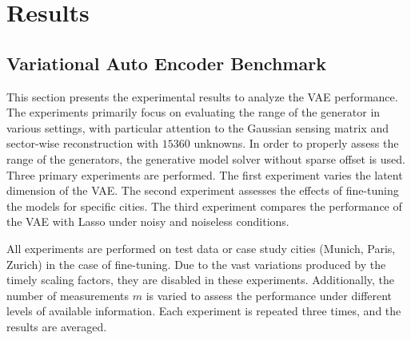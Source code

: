 
\chapter{Results}\label{chapter:results}
\section{Variational Auto Encoder Benchmark}\label{section:vae_benchmark}
This section presents the experimental results to analyze the \gls{VAE} performance.
The experiments primarily focus on evaluating the range of the generator in various settings, with particular attention to the Gaussian sensing matrix and sector-wise reconstruction with $15360$ unknowns.
In order to properly assess the range of the generators, the generative model solver without sparse offset is used.
Three primary experiments are performed.
The first experiment varies the latent dimension of the \gls{VAE}.
The second experiment assesses the effects of fine-tuning the models for specific cities.
The third experiment compares the performance of the \gls{VAE} with \gls{Lasso} under noisy and noiseless conditions.

All experiments are performed on test data or case study cities (Munich, Paris, Zurich) in the case of fine-tuning.
Due to the vast variations produced by the timely scaling factors, they are disabled in these experiments.
Additionally, the number of measurements $m$ is varied to assess the performance under different levels of available information.
Each experiment is repeated three times, and the results are averaged.

